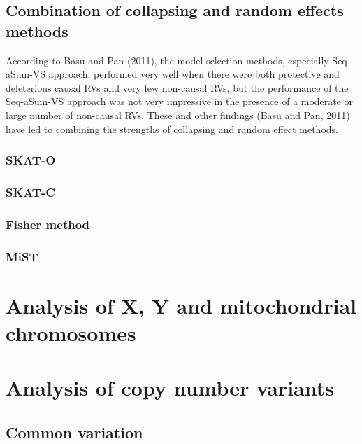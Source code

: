 \documentclass[]{book}
\theoremstyle{definition}
\theoremstyle{definition}
\theoremstyle{definition}
\theoremstyle{remark}
\begin{document}
\subsection{Combination of collapsing and random effects
methods}\label{combination-of-collapsing-and-random-effects-methods}

According to Basu and Pan (2011), the model selection methods,
especially Seq-aSum-VS approach, performed very well when there were
both protective and deleterious causal RVs and very few non-causal RVs,
but the performance of the Seq-aSum-VS approach was not very impressive
in the presence of a moderate or large number of non-causal RVs. These
and other ﬁndings (Basu and Pan, 2011) have led to combining the
strengths of collapsing and random eﬀect methods.

\subsubsection{SKAT-O}\label{skat-o}

\subsubsection{SKAT-C}\label{skat-c}

\subsubsection{Fisher method}\label{fisher-method}

\subsubsection{MiST}\label{mist}

\section{Analysis of X, Y and mitochondrial
chromosomes}\label{analysis-of-x-y-and-mitochondrial-chromosomes}

\section{Analysis of copy number
variants}\label{analysis-of-copy-number-variants}

\subsection{Common variation}\label{common-variation}
\end{document}
